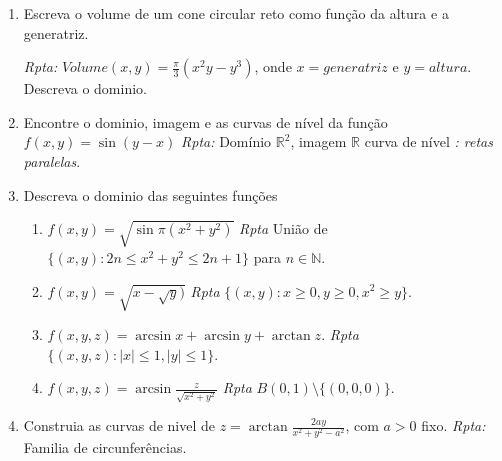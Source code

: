 \documentclass[11pt]{article}
\begin{document}
     \begin{enumerate}
     \item Escreva  o volume de um cone circular reto como função da altura  e a generatriz. 
     
     {\it Rpta:} $Volume(x,y)=\frac{\pi}{3}(x^2y-y^{3})$, onde
     $x=generatriz$ e
     $y =altura$. Descreva o dominio. 
     \item Encontre o dominio, imagem e as curvas de nível da função 
     $f(x,y)=\sin(y-x)$ {\it Rpta:} Domínio $\mathbb{R}^{2}$, 
     imagem $\mathbb{R}$ curva de nível {\it: retas paralelas}.
     \item Descreva o dominio das seguintes funções 
       \begin{enumerate}
       \item $f(x,y)=\sqrt{\sin\pi(x^{2}+y^{2})}$ 
       {\it Rpta} 
       União de $\{(x,y): 2n\leq x^{2}+y^{2}\leq 2n+1\}$
        para $n \in \mathbb{N}$.
        \item $f(x,y)=\sqrt{x-\sqrt{y})}$ 
       {\it Rpta} 
       $\{(x,y): x\geq 0, y \geq 0, x^{2}\geq y\}$.
        \item $f(x,y,z)=\arcsin x+ \arcsin y+ \arctan z$. {\it Rpta} 
       $\{(x,y,z): |x|\leq 1, |y|\leq 1\}$.
        \item $f(x,y,z)=\arcsin\frac{z}{\sqrt{x^{2}+y^{2}}}$ 
       {\it Rpta} $B(0,1)\setminus \{(0,0,0)\}$.
       \end{enumerate}
      \item Construia as curvas de nivel de 
      $z=\arctan \frac{2ay}{x^{2}+y^{2}-a^{2}}$, com $a>0$ fixo. 
      {\it Rpta:} Familia de circunferências.  
     \end{enumerate}
     
\end{document}
